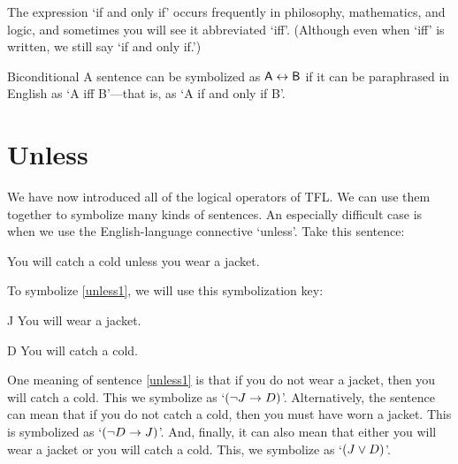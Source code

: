 The expression `if and only if' occurs frequently in philosophy, mathematics, and logic, and sometimes you will see it abbreviated `iff'. (Although even when `iff' is written, we still say `if and only if.') 

\begin{factboxy}{Biconditional}
		A sentence can be symbolized as $\mathsf{A} \leftrightarrow \mathsf{B}$ if it can be paraphrased in English as `A iff B'---that is, as `A if and only if B'.
\end{factboxy}
	

\section{Unless}\label{s:unless}
We have now introduced all of the logical operators of TFL. We can use them together to symbolize many kinds of sentences. An especially difficult case is when we use the English-language connective `unless'. Take this sentence:

\begin{earg}
\item[\ex{unless1}] You will catch a cold unless you wear a jacket. 
\end{earg}
To symbolize \ref{unless1}, we will use this symbolization key:
	\begin{ekey}
		\item[J] You will wear a jacket.
		\item[D] You will catch a cold.
	\end{ekey}

One meaning of sentence \ref{unless1} is that if you do not wear a jacket, then you will catch a cold. This we symbolize as `$({\neg} J \rightarrow D)$'. Alternatively, the sentence can mean that if you do not catch a cold, then you must have worn a jacket. This is symbolized as `$({\neg} D \rightarrow J)$'. And, finally, it can also mean that either you will wear a jacket or you will catch a cold. This, we symbolize as `$(J \vee D)$'.

